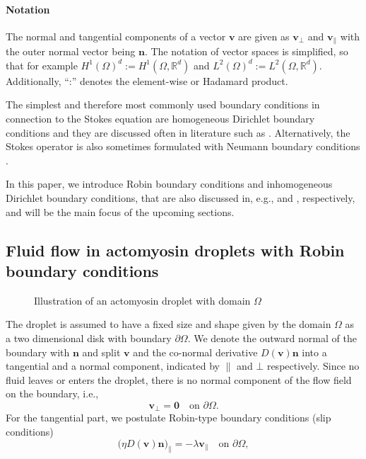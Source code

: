 \documentclass[final,leqno]{scrarticle}
\newcommand{\Hd}{{H^1(\Omega)^d}}
\newcommand{\lzd}{{L^2(\Omega)^d}}
\begin{document}
\paragraph{Notation} 
The normal and tangential components of a vector $\mathbf{v}$ are given as $\mathbf{v}_\perp$ and $\mathbf{v}_{\parallel}$ with the outer normal vector being $\mathbf{n}$. The notation of vector spaces is simplified, so that for example $\Hd := H^1(\Omega, \mathbb{R}^d)$ and $\lzd := L^2(\Omega, \mathbb{R}^d)$. Additionally, ``:'' denotes the element-wise or Hadamard product.

The simplest and therefore most commonly used boundary conditions in connection to the Stokes equation are homogeneous Dirichlet boundary conditions and they are discussed often in literature such as \cite{Bof13,Soh01,John10}. Alternatively, the Stokes operator is also sometimes formulated with Neumann boundary conditions \cite{Mit11}. 

In this paper, we introduce Robin boundary conditions and inhomogeneous Dirichlet boundary conditions, that are also discussed in, e.g., \cite{Ray07} and \cite{Amr11}, respectively, and will be the main focus of the upcoming sections.

\subsection{Fluid flow in actomyosin droplets with Robin boundary conditions}

\begin{figure}
    \centering
    \def\svgwidth{200pt}
    
    \caption{Illustration of an actomyosin droplet with domain $\Omega$}
    \label{fig:bc_robin}
\end{figure}

The droplet is assumed to have a fixed size and shape given by the domain $\Omega$ as a two dimensional disk with boundary $\partial \Omega$. We denote the outward normal of the boundary with $\mathbf{n}$ and  split $\mathbf{v}$ and the co-normal derivative $D(\mathbf{v}) \mathbf{n}$ into a tangential and a normal component, indicated by $\parallel$ and $\bot$ respectively.
Since no fluid leaves or enters the droplet, there is no normal component of the flow field on the boundary, i.e.,
\begin{displaymath}
 \mathbf{v}_{\bot} = \mathbf{0} \quad \text{on } \partial\Omega.
\end{displaymath}
For the tangential part, we postulate Robin-type boundary conditions (slip conditions)
\begin{displaymath} 
 \big(\eta D(\mathbf{v})\mathbf{n} \big)_{\parallel} = -\lambda \mathbf{v}_{\parallel}\quad \text{on } \partial\Omega,
\end{displaymath}
\end{document}
